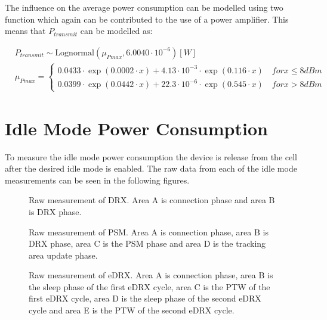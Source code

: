 The influence on the average power consumption can be modelled using two function which again can be contributed to the use of a power amplifier. This means that $P_{transmit}$ can be modelled as:

\begin{align}
&P_{transmit} \sim \text{Lognormal}(\mu_{Pmax},6.0040\cdot 10^{-6}) [W]\\ \nonumber
&\mu_{Pmax} = \begin{cases} 0.0433\cdot\exp{(0.0002\cdot x)} + 4.13\cdot10^{-3}\cdot\exp{(0.116\cdot x)} \quad for x \leq 8 dBm \\
0.0399\cdot\exp{(0.0442\cdot x)} + 22.3\cdot10^{-6}\cdot\exp{(0.545\cdot x)} \quad for x > 8 dBm \end{cases}
\end{align}


\section{Idle Mode Power Consumption}
To measure the idle mode power consumption the device is release from the cell after the desired idle mode is enabled. The raw data from each of the idle mode measurements can be seen in the following figures.

\begin{minipage}{0.48\textwidth}
\begin{figure}[H]
\centering
\resizebox{\textwidth}{!}{
}
\caption{Raw measurement of \gls{DRX}. Area A is connection phase and area B is DRX phase.}
\label{fig:DRX}
\end{figure}
\vspace{0.8em}
\end{minipage}%
\hfill
\begin{minipage}{0.48\textwidth}
\begin{figure}[H]
\centering
\resizebox{\textwidth}{!}{
}
\caption{Raw measurement of \gls{PSM}. Area A is connection phase, area B is DRX phase, area C is the PSM phase and area D is the tracking area update phase.}
\label{fig:PSM}
\end{figure}
\end{minipage}
\vspace{1em}
\begin{figure}[H]
\centering
\begin{minipage}{0.48\textwidth}
\resizebox{\textwidth}{!}{
}
\caption{Raw measurement of \gls{eDRX}. Area A is connection phase, area B is the sleep phase of the first eDRX cycle, area C is the \gls{PTW} of the first eDRX cycle, area D is the sleep phase of the second eDRX cycle and area E is the \gls{PTW} of the second eDRX cycle.}
\label{fig:eDRX1}
\end{minipage}
\end{figure}

